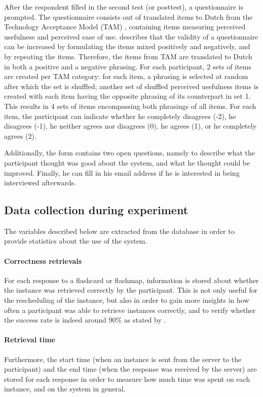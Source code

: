 After the respondent filled in the second test (or posttest), a questionnaire is prompted. The questionnaire consists out of translated items to Dutch from the Technology Acceptance Model (TAM) \cite{tam}, containing items measuring perceived usefulness and perceived ease of use.  describes that the validity of a questionnaire can be increased by formulating the items mixed positively and negatively, and by repeating the items. Therefore, the items from TAM are translated to Dutch in both a positive and a negative phrasing. For each participant, 2 sets of items are created per TAM category: for each item, a phrasing is selected at random after which the set is shuffled; another set of shuffled perceived usefulness items is created with each item having the opposite phrasing of its counterpart in set 1. This results in 4 sets of items encompassing both phrasings of all items. For each item, the participant can indicate whether he completely disagrees (-2), he disagrees (-1), he neither agrees nor disagrees (0), he agrees (1), or he completely agrees (2).

Additionally, the form contains two open questions, namely to describe what the participant thought was good about the system, and what he thought could be improved. Finally, he can fill in his email address if he is interested in being interviewed afterwards.

\subsection{Data collection during experiment}

The variables described below are extracted from the database in order to provide statistics about the use of the system.

\paragraph{Correctness retrievals} For each response to a flashcard or flashmap, information is stored about whether the instance was retrieved correctly by the participant. This is not only useful for the rescheduling of the instance, but also in order to gain more insights in how often a participant was able to retrieve instances correctly, and to verify whether the success rate is indeed around 90\% as stated by .

\paragraph{Retrieval time} Furthermore, the start time (when an instance is sent from the server to the participant) and the end time (when the response was received by the server) are stored for each response in order to measure how much time was spent on each instance, and on the system in general.

